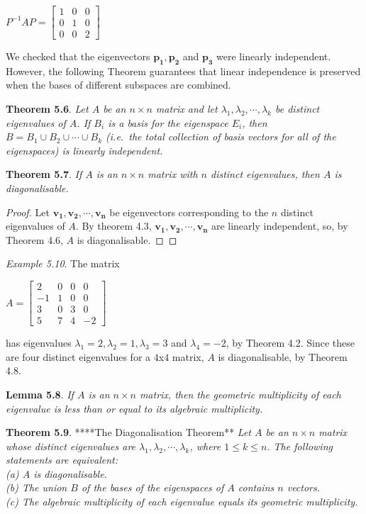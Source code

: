 \documentclass[
  letterpaper,
  DIV=11,
  numbers=noendperiod]{scrartcl}
\theoremstyle{remark}
\begin{document}
\(P^{-1}AP = \left[\begin{array}{ccc} 1 & 0 & 0 \\ 0 & 1 & 0 \\ 0 & 0 & 2 \end{array}\right]\)

We checked that the eigenvectors \(\mathbf{p_{1}}, \mathbf{p_{2}}\) and
\(\mathbf{p_{3}}\) were linearly independent. However, the following
Theorem guarantees that linear independence is preserved when the bases
of different subspaces are combined.

\textbf{Theorem 5.6}. \emph{Let \(A\) be an \(n \times n\) matrix and
let \(\lambda _{1}, \lambda _{2}, \cdots, \lambda _{k}\) be distinct
eigenvalues of \(A\). If \(B_{i}\) is a basis for the eigenspace
\(E_{i}\), then \(B = B_{1} \cup B_{2} \cup \cdots \cup B_{k}\)
(i.e.~the total collection of basis vectors for all of the eigenspaces)
is linearly independent.}

\textbf{Theorem 5.7}. \emph{If \(A\) is an \(n \times n\) matrix with
\(n\) distinct eigenvalues, then \(A\) is diagonalisable.}

\begin{proof}
Let \(\mathbf{v_{1}}, \mathbf{v_{2}}, \cdots, \mathbf{v_{n}}\) be
eigenvectors corresponding to the \(n\) distinct eigenvalues of \(A\).
By theorem 4.3,
\(\mathbf{v_{1}}, \mathbf{v_{2}}, \cdots, \mathbf{v_{n}}\) are linearly
independent, so, by Theorem 4.6, \(A\) is diagonalisable.~◻
\end{proof}

\emph{Example 5.10}. The matrix

\(A = \left[\begin{array}{cccc}
            2 & 0 & 0 & 0 \\
            -1 & 1 & 0 & 0 \\
            3 & 0 & 3 & 0 \\
            5 & 7 & 4 & -2
        \end{array}\right]\)

has eigenvalues \(\lambda _{1} = 2, \lambda _{2} = 1, \lambda _{3} = 3\)
and \(\lambda _{4} = -2\), by Theorem 4.2. Since these are four distinct
eigenvalues for a \(4\)x\(4\) matrix, \(A\) is diagonalisable, by
Theorem 4.8.

\textbf{Lemma 5.8}. \emph{If \(A\) is an \(n \times n\) matrix, then the
geometric multiplicity of each eigenvalue is less than or equal to its
algebraic multiplicity.}

\textbf{Theorem 5.9}. ****The Diagonalisation
Theorem**\emph{\hfill\break
Let \(A\) be an \(n \times n\) matrix whose distinct eigenvalues are
\(\lambda _{1}, \lambda _{2}, \cdots, \lambda _{k}\), where
\(1\leq k\leq n\). The following statements are equivalent:\\
(a) \(A\) is diagonalisable.\\
(b) The union \(B\) of the bases of the eigenspaces of \(A\) contains
\(n\) vectors.\\
(c) The algebraic multiplicity of each eigenvalue equals its geometric
multiplicity.}
\end{document}
